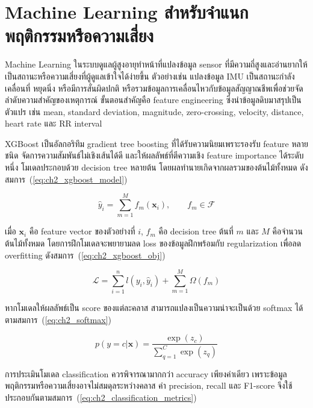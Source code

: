 \section{Machine Learning สำหรับจำแนกพฤติกรรมหรือความเสี่ยง}
\label{sec:ch2_ml_behavior}

Machine Learning ในระบบดูแลผู้สูงอายุทำหน้าที่แปลงข้อมูล sensor ที่มีความถี่สูงและอ่านยากให้เป็นสถานะหรือความเสี่ยงที่ผู้ดูแลเข้าใจได้ง่ายขึ้น ตัวอย่างเช่น แปลงข้อมูล IMU เป็นสถานะกำลังเคลื่อนที่ หยุดนิ่ง หรือมีการสั่นผิดปกติ หรือรวมข้อมูลการเคลื่อนไหวกับข้อมูลสัญญาณชีพเพื่อช่วยจัดลำดับความสำคัญของเหตุการณ์ ขั้นตอนสำคัญคือ feature engineering ซึ่งนำข้อมูลดิบมาสรุปเป็นตัวแปร เช่น mean, standard deviation, magnitude, zero-crossing, velocity, distance, heart rate และ RR interval

XGBoost เป็นอัลกอริทึม gradient tree boosting ที่ได้รับความนิยมเพราะรองรับ feature หลายชนิด จัดการความสัมพันธ์ไม่เชิงเส้นได้ดี และให้ผลลัพธ์ที่ตีความเชิง feature importance ได้ระดับหนึ่ง โมเดลประกอบด้วย decision tree หลายต้น โดยผลทำนายเกิดจากผลรวมของต้นไม้ทั้งหมด ดังสมการ~(\ref{eq:ch2_xgboost_model}) \cite{Chen2016XGBoost}

\begin{equation}
    \hat{y}_i = \sum_{m=1}^{M} f_m(\mathbf{x}_i), \qquad f_m \in \mathcal{F}
    \label{eq:ch2_xgboost_model}
\end{equation}

เมื่อ $\mathbf{x}_i$ คือ feature vector ของตัวอย่างที่ $i$, $f_m$ คือ decision tree ต้นที่ $m$ และ $M$ คือจำนวนต้นไม้ทั้งหมด โดยการฝึกโมเดลจะพยายามลด loss ของข้อมูลฝึกพร้อมกับ regularization เพื่อลด overfitting ดังสมการ~(\ref{eq:ch2_xgboost_obj})

\begin{equation}
    \mathcal{L} = \sum_{i=1}^{n} l(y_i,\hat{y}_i) + \sum_{m=1}^{M}\Omega(f_m)
    \label{eq:ch2_xgboost_obj}
\end{equation}

หากโมเดลให้ผลลัพธ์เป็น score ของแต่ละคลาส สามารถแปลงเป็นความน่าจะเป็นด้วย softmax ได้ตามสมการ~(\ref{eq:ch2_softmax})

\begin{equation}
    p(y=c|\mathbf{x}) = \frac{\exp(z_c)}{\sum_{q=1}^{C}\exp(z_q)}
    \label{eq:ch2_softmax}
\end{equation}

การประเมินโมเดล classification ควรพิจารณามากกว่า accuracy เพียงค่าเดียว เพราะข้อมูลพฤติกรรมหรือความเสี่ยงอาจไม่สมดุลระหว่างคลาส ค่า precision, recall และ F1-score จึงใช้ประกอบกันตามสมการ~(\ref{eq:ch2_classification_metrics}) \cite{Sokolova2009ClassificationMetrics}

